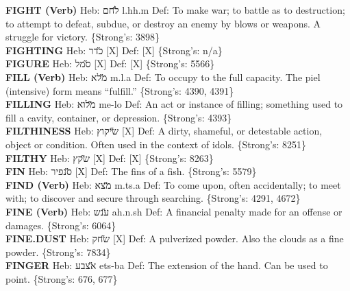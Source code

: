 {\textbf{FIGHT (Verb)} Heb: {\large\H לחם} l.hh.m Def: To make war; to battle as to destruction; to attempt to defeat, subdue, or destroy an enemy by blows or weapons. A struggle for victory. \{Strong's: 3898\}\hfill{}\\

\textbf{FIGHTING} Heb: {\large\H כדר} {[}X{]} Def: {[}X{]} \{Strong's: n/a\}\hfill{}\\

\textbf{FIGURE} Heb: {\large\H סמל} {[}X{]} Def: {[}X{]} \{Strong's: 5566\}\hfill{}\\

\textbf{FILL (Verb)} Heb: {\large\H מלא} m.l.a Def: To occupy to the full capacity. The piel (intensive) form means ``fulfill.'' \{Strong's: 4390, 4391\}\hfill{}\\

\textbf{FILLING} Heb: {\large\H מלוא} me-lo Def: An act or instance of filling; something used to fill a cavity, container, or depression. \{Strong's: 4393\}\hfill{}\\

\textbf{FILTHINESS} Heb: {\large\H שיקוץ} {[}X{]} Def: A dirty, shameful, or detestable action, object or condition. Often used in the context of idols. \{Strong's: 8251\}\hfill{}\\

\textbf{FILTHY} Heb: {\large\H שקץ} {[}X{]} Def: {[}X{]} \{Strong's: 8263\}\hfill{}\\

\textbf{FIN} Heb: {\large\H סנפיר} {[}X{]} Def: The fins of a fish. \{Strong's: 5579\}\hfill{}\\

\textbf{FIND (Verb)} Heb: {\large\H מצא} m.ts.a Def: To come upon, often accidentally; to meet with; to discover and secure through searching. \{Strong's: 4291, 4672\}\hfill{}\\

\textbf{FINE (Verb)} Heb: {\large\H ענש} ah.n.sh Def: A financial penalty made for an offense or damages. \{Strong's: 6064\}\hfill{}\\

\textbf{FINE.DUST} Heb: {\large\H שחק} {[}X{]} Def: A pulverized powder. Also the clouds as a fine powder. \{Strong's: 7834\}\hfill{}\\

\textbf{FINGER} Heb: {\large\H אצבע} ets-ba Def: The extension of the hand. Can be used to point. \{Strong's: 676, 677\}\hfill{}\\

}
